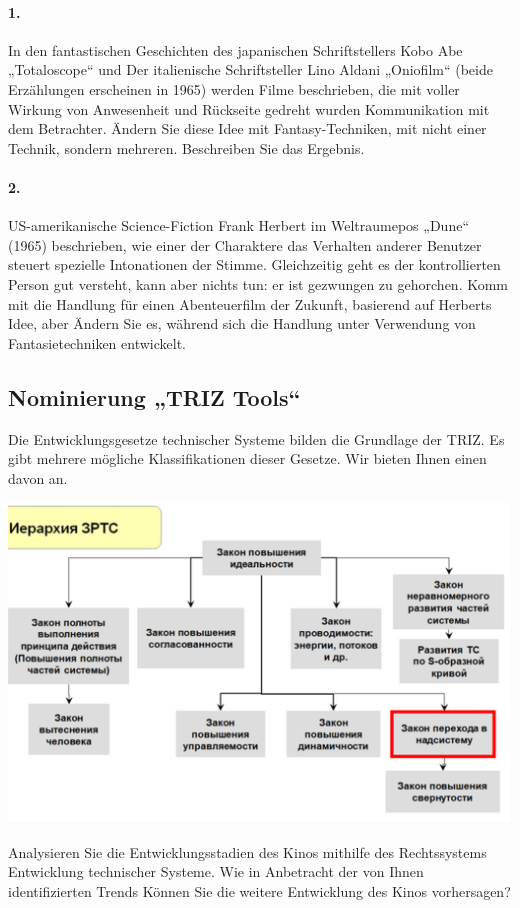 \documentclass[11pt,a4paper]{article}
\begin{document}
\paragraph{1.}
In den fantastischen Geschichten des japanischen Schriftstellers Kobo Abe
„Totaloscope“ und Der italienische Schriftsteller Lino Aldani „Oniofilm“
(beide Erzählungen erscheinen in 1965) werden Filme beschrieben, die mit
voller Wirkung von Anwesenheit und Rückseite gedreht wurden Kommunikation mit
dem Betrachter. Ändern Sie diese Idee mit Fantasy-Techniken, mit nicht einer
Technik, sondern mehreren. Beschreiben Sie das Ergebnis.

\paragraph{2.}
US-amerikanische Science-Fiction Frank Herbert im Weltraumepos „Dune“ (1965)
beschrieben, wie einer der Charaktere das Verhalten anderer Benutzer steuert
spezielle Intonationen der Stimme. Gleichzeitig geht es der kontrollierten
Person gut versteht, kann aber nichts tun: er ist gezwungen zu gehorchen. Komm
mit die Handlung für einen Abenteuerfilm der Zukunft, basierend auf Herberts
Idee, aber Ändern Sie es, während sich die Handlung unter Verwendung von
Fantasietechniken entwickelt.

\subsection*{Nominierung „TRIZ Tools“}

Die Entwicklungsgesetze technischer Systeme bilden die Grundlage der TRIZ. Es
gibt mehrere mögliche Klassifikationen dieser Gesetze. Wir bieten Ihnen einen
davon an.
\begin{center}
  \includegraphics[width=.9\textwidth]{oE4yUs.png}
\end{center}
Analysieren Sie die Entwicklungsstadien des Kinos mithilfe des Rechtssystems
Entwicklung technischer Systeme. Wie in Anbetracht der von Ihnen
identifizierten Trends Können Sie die weitere Entwicklung des Kinos
vorhersagen?
\end{document}
